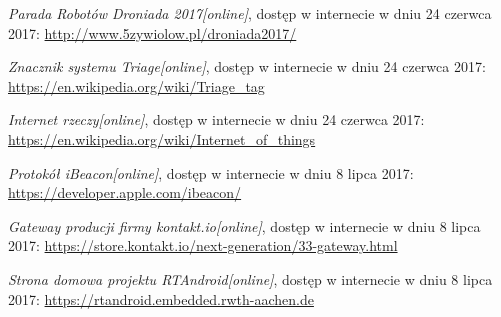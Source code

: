 \begin{thebibliography}{99}
 \emph{Parada Robotów Droniada 2017[online]}, dostęp w internecie w dniu 24 czerwca 2017:
 \url{http://www.5zywiolow.pl/droniada2017/}
 
 \emph{Znacznik systemu Triage[online]}, dostęp w internecie w dniu 24 czerwca 2017:
 \url{https://en.wikipedia.org/wiki/Triage_tag}

 \emph{Internet rzeczy[online]}, dostęp w internecie w dniu 24 czerwca 2017:
 \url{https://en.wikipedia.org/wiki/Internet_of_things}

 \emph{Protokół iBeacon[online]}, dostęp w internecie w dniu 8 lipca 2017:
 \url{https://developer.apple.com/ibeacon/}

 \emph{Gateway producji firmy kontakt.io[online]}, dostęp w internecie w dniu 8 lipca 2017:
 \url{https://store.kontakt.io/next-generation/33-gateway.html}

 \emph{Strona domowa projektu RTAndroid[online]}, dostęp w internecie w dniu 8 lipca 2017:
 \url{https://rtandroid.embedded.rwth-aachen.de}

\end{thebibliography}
